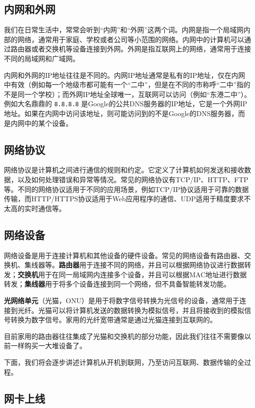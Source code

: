 \subsection{内网和外网}

我们在日常生活中，常常会听到“内网”和“外网”这两个词。内网是指一个局域网内部的网络，通常用于家庭、学校或者公司等小范围的网络。内网中的计算机可以通过路由器或者交换机等设备连接到外网。外网是指互联网上的网络，通常用于连接不同的局域网和广域网。

内网和外网的IP地址往往是不同的。内网IP地址通常是私有的IP地址，仅在内网中有效（例如每一个地级市都可能有一个“二中”，但是在不同的市称呼“二中”指的不是同一个学校）；而外网IP地址全球唯一，互联网可以访问（例如“东港二中”）。例如大名鼎鼎的 \texttt{8.8.8.8} 是Google的公共DNS服务器的IP地址，它是一个外网IP地址。如果在内网中访问该地址，则可能访问到的不是Google的DNS服务器，而是内网中的某个设备。

\subsection{网络协议}

网络协议是计算机之间进行通信的规则和约定。它定义了计算机如何发送和接收数据，以及如何处理错误和异常等情况。常见的网络协议有TCP/IP、HTTP、FTP等。不同的网络协议适用于不同的应用场景，例如TCP/IP协议适用于可靠的数据传输，而HTTP/HTTPS协议适用于Web应用程序的通信、UDP适用于精度要求不太高的实时通信等。

\subsection{网络设备}

网络设备是用于连接计算机和其他设备的硬件设备。常见的网络设备有路由器、交换机、集线器等。\textbf{路由器}用于连接不同的网络，并且可以根据网络协议进行数据转发；\textbf{交换机}用于在同一局域网内连接多个设备，并且可以根据MAC地址进行数据转发；\textbf{集线器}用于将多个设备连接到同一个网络，但不具备智能转发功能。

\textbf{光网络单元}（光猫，ONU）是用于将数字信号转换为光信号的设备，通常用于连接到光纤。光猫可以将计算机发送的数据转换为模拟信号，并且将接收到的模拟信号转换为数字信号。家用的光纤宽带通常是通过光猫连接到互联网的。

目前家用的路由器往往集成了光猫和交换机的部分功能，因此我们往往不需要像以前一样购买一大堆设备了。

下面，我们将会逐步讲述计算机从开机到联网，乃至访问互联网、数据传输的全过程。

\subsection{网卡上线}

